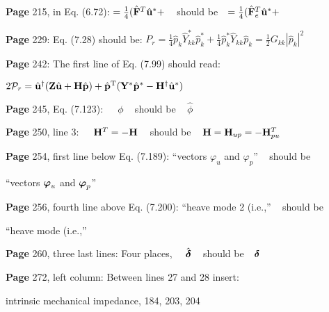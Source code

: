 \documentclass[a4paper,12pt]{article}
\newcommand{\bvf}{\mbox{\boldmath $\varphi$}} %
\newcommand{\bdelta}{\mbox{\boldmath ${\rm \delta}$}}
\begin{document}
\noindent %
{\bf Page} 215, in Eq. (6.72):  $= \frac{1}{4}(\hat{\bf F}^T \hat{\bf u}^* +$ \,\,\ should be \,\,
 $= \frac{1}{4}(\hat{\bf F}_e^T \hat{\bf u}^* +$  
\vspace{0.1cm}

\noindent %
{\bf Page} 229: Eq. (7.28) should be:  $P_r=\frac{1}{4}\hat{p}_k\hat{Y}_{kk}^*\hat{p}_k^*+
	\frac{1}{4}\hat{p}_k^*\hat{Y}_{kk}\hat{p}_k =\frac{1}{2}G_{kk} |\hat{p}_k|^2$ %
\vspace{0.2cm}

\noindent %
{\bf Page} 242: The first line of Eq. (7.99) should read:

$2{\cal P}_r=\hat{\bf u}^{\dagger}({\bf Z}\hat{\bf u}+{\bf H}\hat{\bf p})+
	\hat{\bf p}^{\rm T}({\bf Y}^*\hat{\bf p}^*-{\bf H}^{\dagger}\hat{\bf u}^*)$  %
\vspace{0.2cm}

\noindent %
{\bf Page} 245, Eq. (7.123): \,\,\, \,\,$\phi$  \,\,\, should be \,\,\, $\hat{\phi}$ %
\vspace{0.2cm}

\noindent %
{\bf Page} 250, line 3: \,\,\, \,\,${\bf H}^T = - {\bf H}$  \,\,\, should be \,\,\, ${\bf H} = {\bf H}_{up} = - {\bf H}_{pu}^T$ %
\vspace{0.2cm}

\noindent %
{\bf Page} 254, first line below Eq. (7.189):  ``vectors  ${\varphi}_u $ and ${\varphi}_p $'' \,\,\ should be \,\,

``vectors  ${\bvf}_u $ and ${\bvf}_p $''  %
\vspace{0.2cm}

\noindent %
{\bf Page} 256, fourth line above Eq. (7.200):   
``heave mode 2 (i.e.,'' \,\,\, should be \,\,\,

``heave mode (i.e.,'' %
\vspace{0.2cm}

\noindent %
{\bf Page} 260, three last lines: Four places, \,\,\,\ $\hat{\bdelta}$ \,\,\ should be \,\, $\bdelta$ 
\vspace{0.2cm}

\noindent %
{\bf Page} 272, left column: 
Between lines 27 and 28 insert: 

intrinsic mechanical impedance, 184, 203, 204
\end{document}
